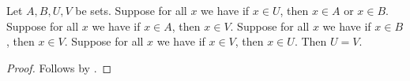 \begin{proposition}\label{cover_extensionality}
    Let $A,B,U,V$ be sets.
    Suppose for all $x$ we have if $x\in U$, then $x\in A$ or $x\in B$.
    Suppose for all $x$ we have if $x\in A$, then $x\in V$.
    Suppose for all $x$ we have if $x\in B$, then $x\in V$.
    Suppose for all $x$ we have if $x\in V$, then $x\in U$.
    Then $U=V$.
\end{proposition}
\begin{proof}
    Follows by .
\end{proof}

